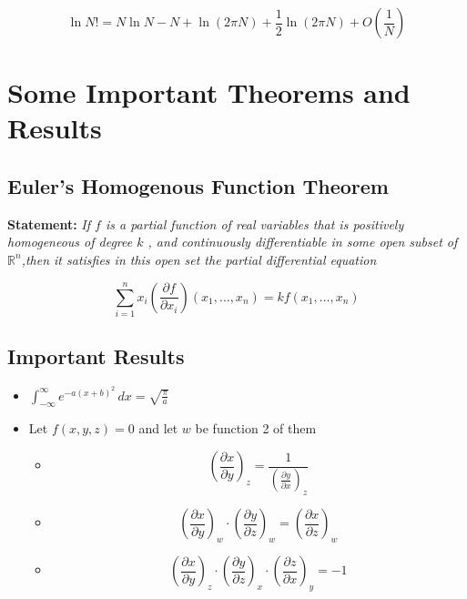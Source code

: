 \documentclass{article}
\begin{document}
$$\ln N! = N \ln N - N + \ln(2\pi N) + \frac{1}{2} \ln(2\pi N) + O\left(\frac{1}{N}\right)$$




\section{Some Important Theorems and Results}
\subsection{Euler's Homogenous Function Theorem}
\textbf{\Large Statement:} \textit{\large If $f$ is a partial function of real variables that is positively homogeneous of degree $k$ , and continuously differentiable in some open subset of $ \mathbb{R}^n $,then it satisfies in this open set the partial differential equation}

$$\sum_{i=1}^{n} x_i \left(\frac{\partial f}{\partial x_i}\right)(x_1, \ldots, x_n) = k f(x_1, \ldots, x_n)$$


\subsection{Important Results}
\begin{itemize}
    \item $\int_{-\infty}^{\infty} e^{-a(x+b)^2} \, dx = \sqrt{\frac{\pi}{a}}$
    \item Let $f(x,y,z)=0 $ and let $w$ be function 2 of them
    \begin{itemize}
        \item $$\left(\frac{\partial x}{\partial y}\right)_z = \frac{1}{\left(\frac{\partial y}{\partial x}\right)_z} $$
        \item $$\left(\frac{\partial x}{\partial y}\right)_w \cdot \left(\frac{\partial y}{\partial z}\right)_w = \left(\frac{\partial x}{\partial z}\right)_w$$
        \item $$\left(\frac{\partial x}{\partial y}\right)_z \cdot \left(\frac{\partial y}{\partial z}\right)_x \cdot \left(\frac{\partial z}{\partial x}\right)_y = -1$$
        
    \end{itemize}

\end{itemize}
\end{document}
